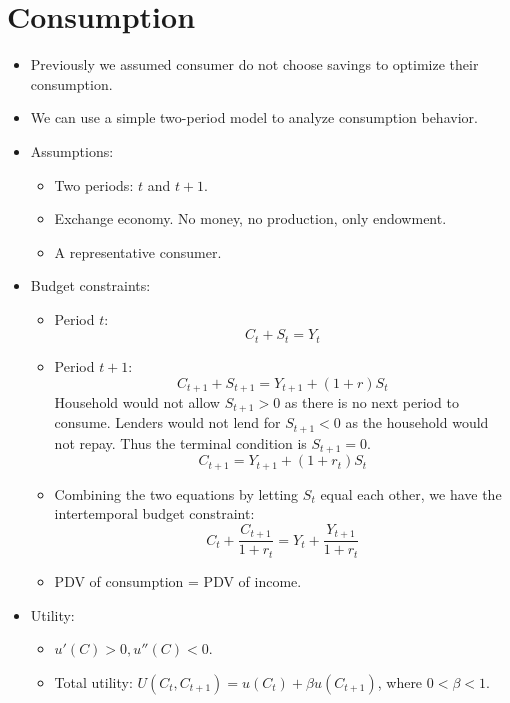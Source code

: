 \documentclass[notitlepage]{article}
\begin{document}
\section{Consumption}
\begin{itemize}
\item Previously we assumed consumer do not choose savings to optimize their consumption.
\item We can use a simple two-period model to analyze consumption behavior.
\item Assumptions:
\begin{itemize}
\item Two periods: $t$ and $t+1$.
\item Exchange economy. No money, no production, only endowment.
\item A representative consumer.
\end{itemize}
\item Budget constraints: 
\begin{itemize}
\item Period $t$:
\begin{equation*}
C_t + S_t = Y_t \label{(1)}
\end{equation*}
\item Period $t+1$:
\begin{equation*}
C_{t+1} + S_{t+1} = Y_{t+1} + (1+r)S_t
\end{equation*}
Household would not allow $S_{t+1} > 0$ as there is no next period to consume. Lenders would not lend for $S_{t+1} < 0$ as the household would not repay. Thus the terminal condition is $S_{t+1} = 0$.
\begin{equation*}
C_{t+1} = Y_{t+1} + (1+r_t)S_t
\end{equation*}
\item Combining the two equations by letting $S_t$ equal each other, we have the intertemporal budget constraint:
\[
C_t + \frac{C_{t+1}}{1+r_t} = Y_t + \frac{Y_{t+1}}{1+r_t}
\]
\item PDV of consumption = PDV of income.
\end{itemize}

\item Utility:
\begin{itemize}
\item $u'(C) > 0, u''(C) < 0.$
\item Total utility: $U(C_t, C_{t+1}) = u(C_t) + \beta u(C_{t+1})$, where $0 < \beta < 1$.
\end{itemize}


\end{itemize}
\end{document}
